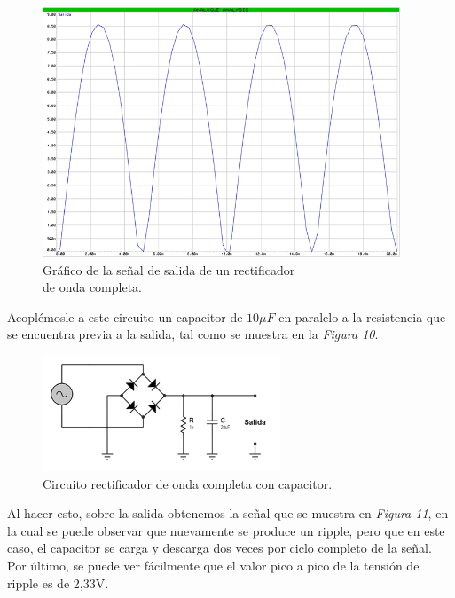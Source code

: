 \documentclass{article}
\begin{document}
\newpage
\begin{figure}[h]
	\centering
	\includegraphics[width=0.95\textwidth]{images/4-4-6-grafico-circuito-rectificador-onda-completa.jpg}
	\medskip
	\caption{Gráfico de la señal de salida de un rectificador\\ de onda completa.}
\end{figure}
\bigskip\bigskip


	Acoplémosle a este circuito un capacitor de $10\mu F$ en paralelo a la resistencia que se encuentra previa a la salida, tal como se muestra en la \textit{Figura 10}.
\bigskip


\begin{figure}[h]
	\centering
	\includegraphics[width=0.633\textwidth]{images/4-4-7-circuito-rectificador-onda-completa-con-filtro.jpg}
	\medskip
	\caption{Circuito rectificador de onda completa con capacitor.}
\end{figure}
\bigskip\bigskip


Al hacer esto, sobre la salida obtenemos la señal que se muestra en \textit{Figura 11}, en la cual se puede observar que nuevamente se produce un ripple, pero que en este caso, el capacitor se carga y descarga dos veces por ciclo completo de la señal. Por último, se puede ver fácilmente que el valor pico a pico de la tensión de ripple es de 2,33V.
\end{document}
